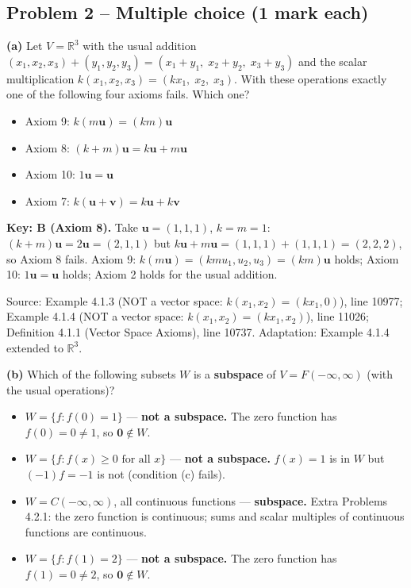 \documentclass[11pt,a4paper]{article}
\newcommand{\Src}[1]{{\footnotesize\color{black!65}Source: #1}}
\begin{document}
\subsection*{Problem 2 -- Multiple choice (1 mark each)}
\textbf{(a)} Let $V=\mathbb{R}^3$ with the usual addition $(x_1,x_2,x_3)+(y_1,y_2,y_3)=(x_1+y_1,\;x_2+y_2,\;x_3+y_3)$ and the scalar multiplication $k(x_1,x_2,x_3)=(kx_1,\;x_2,\;x_3)$. With these operations exactly one of the following four axioms fails. Which one?\par
\begin{itemize}[leftmargin=8mm,itemsep=0pt]\item[A] Axiom 9: $k(m\mathbf{u})=(km)\mathbf{u}$\item[B$^{\ast}$] Axiom 8: $(k+m)\mathbf{u}=k\mathbf{u}+m\mathbf{u}$\item[C] Axiom 10: $1\mathbf{u}=\mathbf{u}$\item[D] Axiom 7: $k(\mathbf{u}+\mathbf{v})=k\mathbf{u}+k\mathbf{v}$\end{itemize}
\textbf{Key: B (Axiom 8).} Take $\mathbf{u}=(1,1,1)$, $k=m=1$: $(k+m)\mathbf{u}=2\mathbf{u}=(2,1,1)$ but $k\mathbf{u}+m\mathbf{u}=(1,1,1)+(1,1,1)=(2,2,2)$, so Axiom 8 fails. Axiom 9: $k(m\mathbf{u})=(kmu_1,u_2,u_3)=(km)\mathbf{u}$ holds; Axiom 10: $1\mathbf{u}=\mathbf{u}$ holds; Axiom 2 holds for the usual addition.\par
\Src{Example 4.1.3 (NOT a vector space: $k(x_1,x_2)=(kx_1,0)$), line 10977; Example 4.1.4 (NOT a vector space: $k(x_1,x_2)=(kx_1,x_2)$), line 11026; Definition 4.1.1 (Vector Space Axioms), line 10737. Adaptation: Example 4.1.4 extended to $\mathbb{R}^3$.}\par
{}\textbf{(b)} Which of the following subsets $W$ is a \textbf{subspace} of $V=F(-\infty,\infty)$ (with the usual operations)?\par
\begin{itemize}[leftmargin=8mm,itemsep=0pt]\item[A] $W=\{f : f(0)=1\}$ --- \textbf{not a subspace.} The zero function has $f(0)=0\neq1$, so $\mathbf{0}\notin W$.\item[B] $W=\{f : f(x)\ge0 \text{ for all } x\}$ --- \textbf{not a subspace.} $f(x)=1$ is in $W$ but $(-1)f=-1$ is not (condition (c) fails).\item[C$^{\ast}$] $W=C(-\infty,\infty)$, all continuous functions --- \textbf{subspace.} Extra Problems 4.2.1: the zero function is continuous; sums and scalar multiples of continuous functions are continuous.\item[D] $W=\{f : f(1)=2\}$ --- \textbf{not a subspace.} The zero function has $f(1)=0\neq2$, so $\mathbf{0}\notin W$.\end{itemize}
\end{document}
